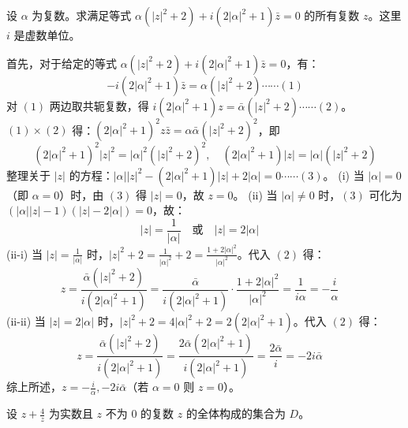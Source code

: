\begin{questions}
\question
设 $\alpha$ 为复数。求满足等式 $\alpha(|z|^2 + 2) + i(2|\alpha|^2 + 1)\bar{z} = 0$ 的所有复数 $z$。这里 $i$ 是虚数单位。
\begin{solution}
    首先，对于给定的等式 $\alpha(|z|^2 + 2) + i(2|\alpha|^2 + 1)\bar{z} = 0$，有：
    \[
    -i(2|\alpha|^2 + 1)\bar{z} = \alpha(|z|^2 + 2) \cdots\cdots (1)
    \]
    对 $(1)$ 两边取共轭复数，得 $i(2|\alpha|^2 + 1)z = \bar{\alpha}(|z|^2 + 2) \cdots\cdots (2)$。
    $(1) \times (2)$ 得：$(2|\alpha|^2 + 1)^2 z\bar{z} = \alpha\bar{\alpha}(|z|^2 + 2)^2$，即
    \[
    (2|\alpha|^2 + 1)^2 |z|^2 = |\alpha|^2 (|z|^2 + 2)^2, \quad (2|\alpha|^2 + 1)|z| = |\alpha|(|z|^2 + 2)
    \]
    整理关于 $|z|$ 的方程：$|\alpha||z|^2 - (2|\alpha|^2 + 1)|z| + 2|\alpha| = 0 \cdots\cdots (3)$。
    (i) 当 $|\alpha| = 0$（即 $\alpha = 0$）时，由 $(3)$ 得 $|z| = 0$，故 $z = 0$。
    (ii) 当 $|\alpha| \neq 0$ 时，$(3)$ 可化为 $(|\alpha||z| - 1)(|z| - 2|\alpha|) = 0$，故：
    \[
    |z| = \frac{1}{|\alpha|} \quad \text{或} \quad |z| = 2|\alpha| \quad
    \]
    (ii-i) 当 $|z| = \frac{1}{|\alpha|}$ 时，$|z|^2 + 2 = \frac{1}{|\alpha|^2} + 2 = \frac{1 + 2|\alpha|^2}{|\alpha|^2}$。代入 $(2)$ 得：
    \[
    z = \frac{\bar{\alpha}(|z|^2 + 2)}{i(2|\alpha|^2 + 1)} = \frac{\bar{\alpha}}{i(2|\alpha|^2 + 1)} \cdot \frac{1 + 2|\alpha|^2}{|\alpha|^2} = \frac{1}{i\alpha} = -\frac{i}{\alpha} \quad
    \]
    (ii-ii) 当 $|z| = 2|\alpha|$ 时，$|z|^2 + 2 = 4|\alpha|^2 + 2 = 2(2|\alpha|^2 + 1)$。代入 $(2)$ 得：
    \[
    z = \frac{\bar{\alpha}(|z|^2 + 2)}{i(2|\alpha|^2 + 1)} = \frac{2\bar{\alpha}(2|\alpha|^2 + 1)}{i(2|\alpha|^2 + 1)} = \frac{2\bar{\alpha}}{i} = -2i\bar{\alpha} \quad
    \]
    综上所述，$z = -\frac{i}{\alpha}, -2i\bar{\alpha}$（若 $\alpha=0$ 则 $z=0$）。
\end{solution}

\question
设 $z + \frac{4}{z}$ 为实数且 $z$ 不为 $0$ 的复数 $z$ 的全体构成的集合为 $D$。
\end{questions}
